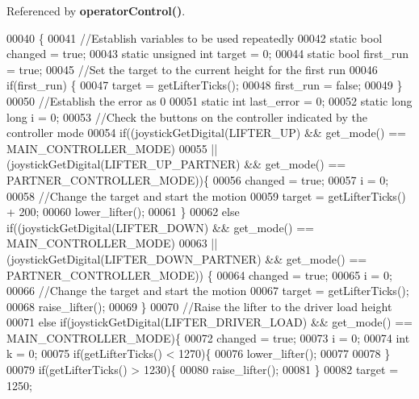 Referenced by \textbf{ operator\+Control()}.


\begin{DoxyCode}
00040                      \{
00041   \textcolor{comment}{//Establish variables to be used repeatedly}
00042   \textcolor{keyword}{static} \textcolor{keywordtype}{bool} changed = \textcolor{keyword}{true};
00043   \textcolor{keyword}{static} \textcolor{keywordtype}{unsigned} \textcolor{keywordtype}{int} target = 0;
00044   \textcolor{keyword}{static} \textcolor{keywordtype}{bool} first\_run = \textcolor{keyword}{true};
00045   \textcolor{comment}{//Set the target to the current height for the first run}
00046   \textcolor{keywordflow}{if}(first\_run) \{
00047     target = getLifterTicks();
00048     first\_run = \textcolor{keyword}{false};
00049   \}
00050   \textcolor{comment}{//Establish the error as 0}
00051   \textcolor{keyword}{static} \textcolor{keywordtype}{int} last\_error = 0;
00052   \textcolor{keyword}{static} \textcolor{keywordtype}{long} \textcolor{keywordtype}{long} i = 0;
00053   \textcolor{comment}{//Check the buttons on the controller indicated by the controller mode}
00054   \textcolor{keywordflow}{if}((joystickGetDigital(LIFTER_UP) && get_mode() == MAIN_CONTROLLER_MODE)
00055    || (joystickGetDigital(LIFTER_UP_PARTNER) && get_mode() == 
      PARTNER_CONTROLLER_MODE))\{
00056     changed = \textcolor{keyword}{true};
00057     i = 0;
00058     \textcolor{comment}{//Change the target and start the motion}
00059     target = getLifterTicks() + 200;
00060     lower_lifter();
00061   \}
00062   \textcolor{keywordflow}{else} \textcolor{keywordflow}{if}((joystickGetDigital(LIFTER_DOWN) && get_mode() == MAIN_CONTROLLER_MODE)
00063    || (joystickGetDigital(LIFTER_DOWN_PARTNER) && get_mode() == 
      PARTNER_CONTROLLER_MODE)) \{
00064     changed = \textcolor{keyword}{true};
00065     i = 0;
00066     \textcolor{comment}{//Change the target and start the motion}
00067     target = getLifterTicks();
00068     raise_lifter();
00069   \}
00070   \textcolor{comment}{//Raise the lifter to the driver load height}
00071   \textcolor{keywordflow}{else} \textcolor{keywordflow}{if}(joystickGetDigital(LIFTER_DRIVER_LOAD) && get_mode() == 
      MAIN_CONTROLLER_MODE)\{
00072     changed = \textcolor{keyword}{true};
00073     i = 0;
00074     \textcolor{keywordtype}{int} k = 0;
00075     \textcolor{keywordflow}{if}(getLifterTicks() < 1270)\{
00076       lower_lifter();
00077 
00078     \}
00079     \textcolor{keywordflow}{if}(getLifterTicks() > 1230)\{
00080       raise_lifter();
00081     \}
00082     target = 1250;

\end{DoxyCode}
